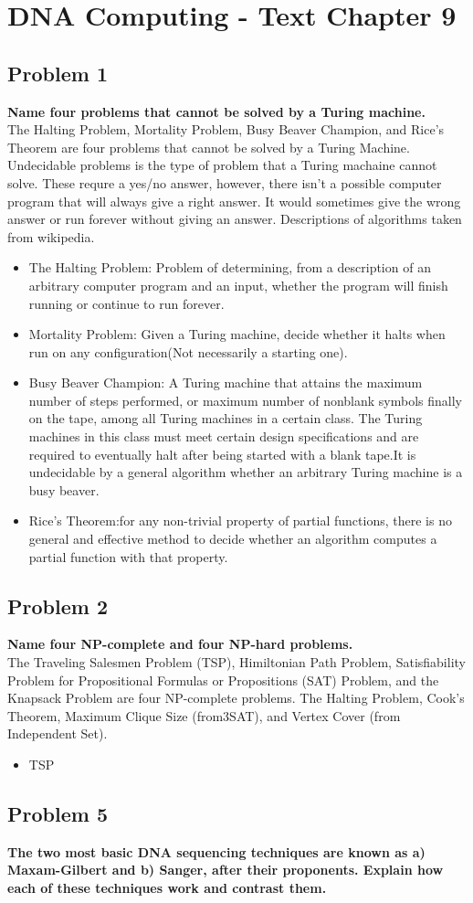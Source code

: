 
\chapter{DNA Computing - Text Chapter 9}


\section{ Problem 1 }
\textbf{ Name four problems that cannot be solved by a Turing machine. } \\
The Halting Problem, Mortality Problem, Busy Beaver Champion, and Rice's Theorem are four problems that cannot be solved by a Turing Machine. Undecidable problems is the type of problem that a Turing machaine cannot solve. These requre a yes/no answer, however, there isn't a possible computer program that will always give a right answer. It would sometimes give the wrong answer or run forever without giving an answer. Descriptions of algorithms taken from wikipedia.
\begin{itemize}
	\item The Halting Problem: Problem of determining, from a description of an arbitrary computer program and an input, whether the program will finish running or continue to run forever.
	\item Mortality Problem: Given a Turing machine, decide whether it halts when run on any configuration(Not necessarily a starting one).
	\item Busy Beaver Champion: A Turing machine that attains the maximum number of steps performed, or maximum number of nonblank symbols finally on the tape, among all Turing machines in a certain class. The Turing machines in this class must meet certain design specifications and are required to eventually halt after being started with a blank tape.It is undecidable by a general algorithm whether an arbitrary Turing machine is a busy beaver.
	\item Rice's Theorem:for any non-trivial property of partial functions, there is no general and effective method to decide whether an algorithm computes a partial function with that property.
\end{itemize}

\section{ Problem 2 }
\textbf{ Name four NP-complete and four NP-hard problems. } \\
The Traveling Salesmen Problem (TSP), Himiltonian Path Problem, Satisfiability Problem for Propositional Formulas or Propositions (SAT) Problem, and the Knapsack Problem are four NP-complete problems. The Halting Problem, Cook's Theorem, Maximum Clique Size (from3SAT), and Vertex Cover (from Independent Set).
\begin{itemize}
	\item TSP
\end{itemize}
\section{ Problem 5 }
\textbf{ The two most basic DNA sequencing techniques are known as a) Maxam-Gilbert and b) Sanger, after their proponents. Explain how each of these techniques work and contrast them. }

